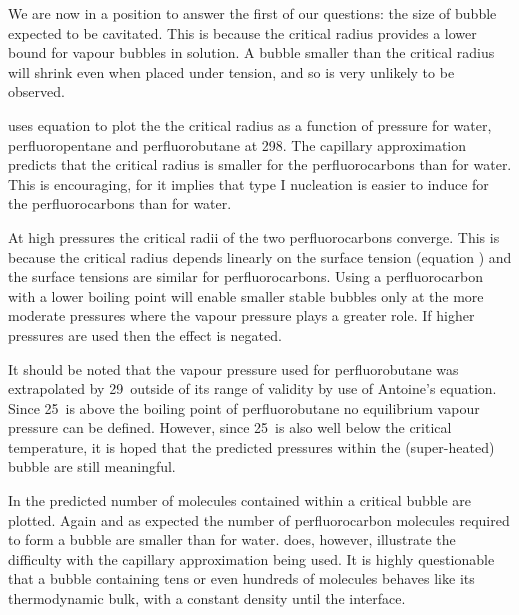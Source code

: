 We are now in a position to answer the first of our questions: the size of bubble expected to be cavitated.
This is because the critical radius provides  a lower bound for vapour bubbles in solution.
A bubble smaller than the critical radius will shrink even when  placed under tension,
and so is very unlikely to be observed.  


 uses equation  to plot the the critical radius as a function of pressure  for water, perfluoropentane and perfluorobutane
at  \unit{298}\kelvin.
The capillary approximation predicts that the critical radius is smaller for the perfluorocarbons than for water.
This is  encouraging, for it implies that type I nucleation is easier to induce for the perfluorocarbons than for water.

At high pressures the critical radii of the two perfluorocarbons converge.
This is because the critical radius depends linearly on the surface tension (equation )
and the surface tensions are similar for perfluorocarbons.
Using a perfluorocarbon with a lower boiling point will enable smaller stable bubbles only at the more moderate  pressures where the vapour pressure plays a greater role.  
If higher pressures are used then the effect is negated.

It should be noted that the vapour pressure used for perfluorobutane was extrapolated by \unit{29}\degreecelsius\  outside of its range of validity\cite{NISTdata}
 by use of Antoine's equation.
Since \unit{25}\degreecelsius\ is above the boiling point of perfluorobutane no  equilibrium vapour pressure can be defined.
However, since \unit{25}\degreecelsius\ is also well below the critical temperature, %
it is hoped that the predicted pressures within the (super-heated) bubble are still meaningful.


In   the predicted number of molecules contained within a critical bubble are plotted.
Again and as expected the number of perfluorocarbon molecules required to form a bubble are smaller than for water.
 does, however, illustrate  the difficulty with the capillary approximation being used.
It is highly questionable that a bubble containing tens or even hundreds of molecules behaves like its thermodynamic bulk, with a constant density until the interface.


